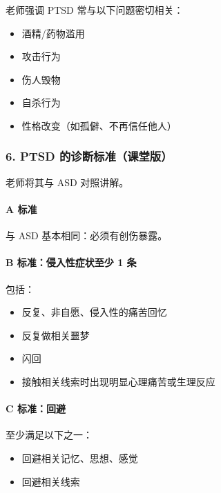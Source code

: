 \documentclass[
  chinese,
  9pt,
  a4paper,
]{ctexart}
\providecommand{\tightlist}{%
  \setlength{\itemsep}{0pt}\setlength{\parskip}{0pt}}
\begin{document}
老师强调 PTSD 常与以下问题密切相关：

\begin{itemize}
\tightlist
\item
  酒精/药物滥用
\item
  攻击行为
\item
  伤人毁物
\item
  自杀行为
\item
  性格改变（如孤僻、不再信任他人）
\end{itemize}

\subsubsection{6. PTSD
的诊断标准（课堂版）}\label{ptsd-ux7684ux8bcaux65adux6807ux51c6ux8bfeux5802ux7248}

老师将其与 ASD 对照讲解。

\paragraph{A 标准}\label{a-ux6807ux51c6}

与 ASD 基本相同：必须有创伤暴露。

\paragraph{B 标准：侵入性症状至少 1
条}\label{b-ux6807ux51c6ux4fb5ux5165ux6027ux75c7ux72b6ux81f3ux5c11-1-ux6761}

包括：

\begin{itemize}
\tightlist
\item
  反复、非自愿、侵入性的痛苦回忆
\item
  反复做相关噩梦
\item
  闪回
\item
  接触相关线索时出现明显心理痛苦或生理反应
\end{itemize}

\paragraph{C 标准：回避}\label{c-ux6807ux51c6ux56deux907f}

至少满足以下之一：

\begin{itemize}
\tightlist
\item
  回避相关记忆、思想、感觉
\item
  回避相关线索
\end{itemize}
\end{document}
